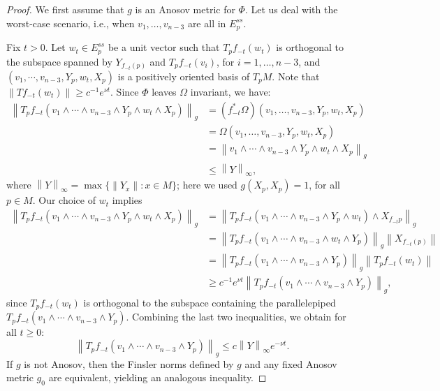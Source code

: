 \documentclass[11pt,letterpaper,reqno,abstract=true]{scrartcl}
\theoremstyle{plain}                              %
\theoremstyle{definition}                         %
\theoremstyle{remark}                             %
\providecommand{\norm}[1]{\left\lVert#1\right\rVert}       %
\begin{document}
\begin{proof}
%
  We first assume that $g$ is an Anosov metric for $\Phi$. Let us deal
  with the worst-case scenario, i.e., when $v_1, \ldots, v_{n-3}$ are
  all in $E^{ss}_p$.

  Fix $t > 0$. Let $w_t \in E^{ss}_p$ be a unit vector such that
  $T_p f_{-t}(w_t)$ is orthogonal to the subspace spanned by
  $Y_{f_{-t}(p)}$ and $T_p f_{-t}(v_i)$, for $i = 1,\ldots, n-3$, and
  $(v_1, \cdots, v_{n-3}, Y_p, w_t, X_p)$ is a positively oriented
  basis of $T_p M$. Note that
  $\norm{T f_{-t}(w_t)} \geq c^{-1} e^{\nu t}$. Since $\Phi$ leaves
  $\Omega$ invariant, we have:
%
  \begin{align*}
    \norm{T_p f_{-t} \left( v_1 \wedge \cdots \wedge v_{n-3} 
        \wedge Y_p \wedge w_t \wedge X_p \right)}_g 
    & = (f_{-t}^\ast \Omega)(v_1, \ldots, v_{n-3}, Y_p, w_t, X_p) \\
    & = \Omega(v_1, \ldots, v_{n-3}, Y_p, w_t, X_p) \\
    & = \norm{v_1 \wedge \cdots \wedge v_{n-3} \wedge Y_p \wedge w_t
     \wedge X_p}_g \\
   & \leq \norm{Y}_\infty,
  \end{align*}
%
  where $\norm{Y}_\infty = \max \{ \norm{Y_x} : x \in M \}$; here we
  used $g(X_p,X_p) = 1$, for all $p \in M$. Our choice of $w_t$
  implies
%
  \begin{align*}
    \norm{T_p f_{-t} \left( v_1 \wedge \cdots \wedge v_{n-3} 
            \wedge Y_p \wedge w_t \wedge X_p \right)}_g
     & = \norm{T_p f_{-t} \left( v_1 \wedge \cdots \wedge v_{n-3} 
            \wedge Y_p \wedge w_t \right) \wedge X_{f_{-t}p}}_g \\
     & = \norm{T_p f_{-t} \left( v_1 \wedge \cdots \wedge v_{n-3} 
           \wedge w_t \wedge Y_p \right)}_g \norm{X_{f_{-t}(p)}}  \\
     & =  \norm{T_p f_{-t} \left( v_1 \wedge 
         \cdots \wedge v_{n-3} \wedge Y_p \right)}_g \norm{T_p
       f_{-t}(w_t)} \\
    & \geq c^{-1} e^{\nu t} \norm{T_p f_{-t} \left( v_1 \wedge 
         \cdots \wedge v_{n-3} \wedge Y_p \right)}_g,
  \end{align*}
%
  since $T_p f_{-t}(w_t)$ is orthogonal to the subspace containing the
  parallelepiped
  $T_p f_{-t} \left( v_1 \wedge \cdots \wedge v_{n-3} \wedge Y_p
  \right)$. Combining the last two inequalities, we obtain for all
  $t \geq 0$:
  \begin{displaymath}
    \norm{T_p f_{-t} \left( v_1 \wedge \cdots \wedge v_{n-3}
    \wedge Y_p \right)}_g \leq c \norm{Y}_\infty e^{-\nu t}.
  \end{displaymath}
  If $g$ is not Anosov, then the Finsler norms defined by $g$ and any
  fixed Anosov metric $g_0$ are equivalent, yielding an analogous
  inequality.
%
\end{proof}
\end{document}
